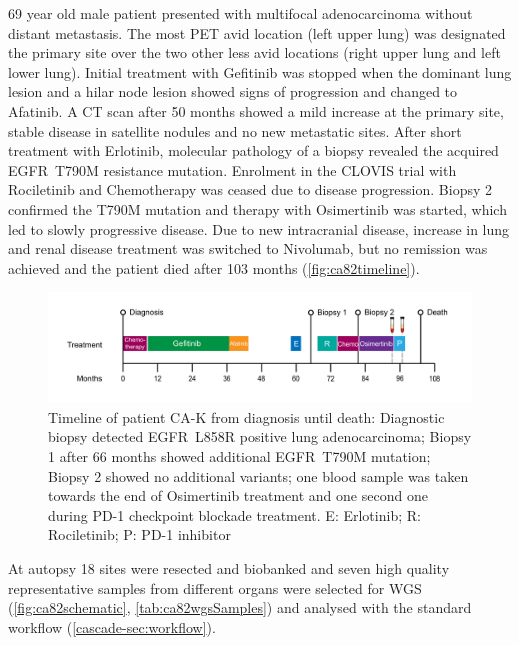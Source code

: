 69 year old male patient presented with multifocal adenocarcinoma without distant metastasis. The most PET avid location (left upper lung) was designated the primary site over the two other less avid locations (right upper lung and left lower lung). Initial treatment with Gefitinib was stopped when the dominant lung lesion and a hilar node lesion showed signs of progression and changed to Afatinib. A CT scan after 50 months showed a mild increase at the primary site, stable disease in satellite nodules and no new metastatic sites. After short treatment with Erlotinib, molecular pathology of a biopsy revealed the acquired EGFR~T790M resistance mutation. Enrolment in the CLOVIS trial with Rociletinib and Chemotherapy was ceased due to disease progression. Biopsy 2 confirmed the T790M mutation and therapy with Osimertinib was started, which led to slowly progressive disease. Due to new intracranial disease, increase in lung and renal disease treatment was switched to Nivolumab, but no remission was achieved and the patient died after 103 months (\autoref{fig:ca82timeline}).



\begin{figure}[ht]
\centering
\includegraphics[width=.99\linewidth]{Figures/CASCADE/CA82/CA-K_timeline}
\caption[Timeline of patient CA-K from diagnosis until death]{Timeline of patient CA-K from diagnosis until death: Diagnostic biopsy detected EGFR~L858R positive lung adenocarcinoma;  Biopsy 1 after 66 months showed additional EGFR~T790M mutation; Biopsy 2 showed no additional variants; one blood sample was taken towards the end of Osimertinib treatment and one second one during PD-1 checkpoint blockade treatment. E: Erlotinib; R: Rociletinib; P: PD-1 inhibitor} \label{fig:ca82timeline}
\end{figure}


At autopsy 18 sites were resected and biobanked and seven high quality representative samples from different organs were selected for WGS (\autoref{fig:ca82schematic}, \autoref{tab:ca82wgsSamples}) and analysed with the standard workflow (\autoref{cascade-sec:workflow}). 




